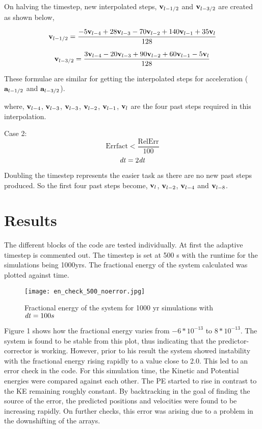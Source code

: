 \documentclass{article}
\begin{document}
{{{On halving the timestep, new interpolated steps, ${\bf v}_{l-{1/2}}$ and ${\bf v}_{l-{3/2}}$ are created as shown below,

\[ {\bf v}_{l-{1/2}} = \frac{-5{\bf v}_{l-4} + 28{\bf v}_{l-3} - 70{\bf v}_{l-2} + 140{\bf v}_{l-1} + 35{\bf v}_l} {128} \]

\[ {\bf v}_{l-{3/2}} = \frac{3{\bf v}_{l-4} - 20{\bf v}_{l-3} + 90{\bf v}_{l-2} + 60{\bf v}_{l-1} - 5{\bf v}_l} {128} \]

These formulae are similar for getting the interpolated steps for acceleration (${\bf a}_{l-{1/2}}$ and ${\bf a}_{l-{3/2}}$). 

where,
${\bf v}_{l-4}$, ${\bf v}_{l-3}$, ${\bf v}_{l-3}$, ${\bf v}_{l-2}$, ${\bf v}_{l-1}$, ${\bf v}_l$ are the four past steps required in this interpolation.

\medskip
Case 2: \[\textrm{Errfact} < \frac{\textrm{RelErr}} {100} \]    \[{\it dt} = 2{\it dt} \]

Doubling the timestep represents the easier task as there are no new past steps produced. So the first four past steps become, ${\bf v}_l$, ${\bf v}_{l-2}$, ${\bf v}_{l-4}$ and ${\bf v}_{l-8}$. }}

\medskip
\section{Results}
{\normalsize{

The different blocks of the code are tested individually. At first the adaptive timestep is commented out. The timestep is set at 500 s with the runtime for the simulations being 1000yrs. The fractional energy of the system calculated was plotted against time.  
\medskip 

\begin{figure} [t]
\texttt{[image: en\_check\_500\_noerror.jpg]}
\centering
\caption{Fractional energy of the system for 1000 yr simulations with ${\it dt} = 100 s$}
\centering
\end{figure}

Figure 1 shows how the fractional energy varies from $-6*10^{-13}$ to $8*10^{-13}$. The system is found to be stable from this plot, thus indicating that the predictor-corrector is working. However, prior to his result the system showed instability with the fractional energy rising rapidly to a value close to 2.0. This led to an error check in the code. For this simulation time, the Kinetic and Potential energies were compared against each other. The PE started to rise in contrast to the KE remaining roughly constant. By backtracking in the goal of finding the source of the error, the predicted positions and velocities were found to be increasing rapidly. On further checks, this error was arising due to a problem in the downshifting of the arrays. 
\medskip

}}}
\end{document}
